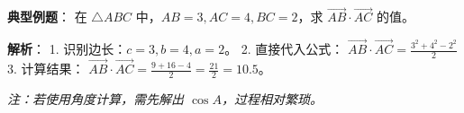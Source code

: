 \begin{examplebox}
\textbf{典型例题}：
在 $\triangle ABC$ 中，$AB=3, AC=4, BC=2$，求 $\vec{AB} \cdot \vec{AC}$ 的值。

\textbf{解析}：
1. 识别边长：$c=3, b=4, a=2$。
2. 直接代入公式：
   $\vec{AB} \cdot \vec{AC} = \frac{3^2 + 4^2 - 2^2}{2}$
3. 计算结果：
   $\vec{AB} \cdot \vec{AC} = \frac{9 + 16 - 4}{2} = \frac{21}{2} = 10.5$。
   
\textit{注：若使用角度计算，需先解出 $\cos A$，过程相对繁琐。}
\end{examplebox}